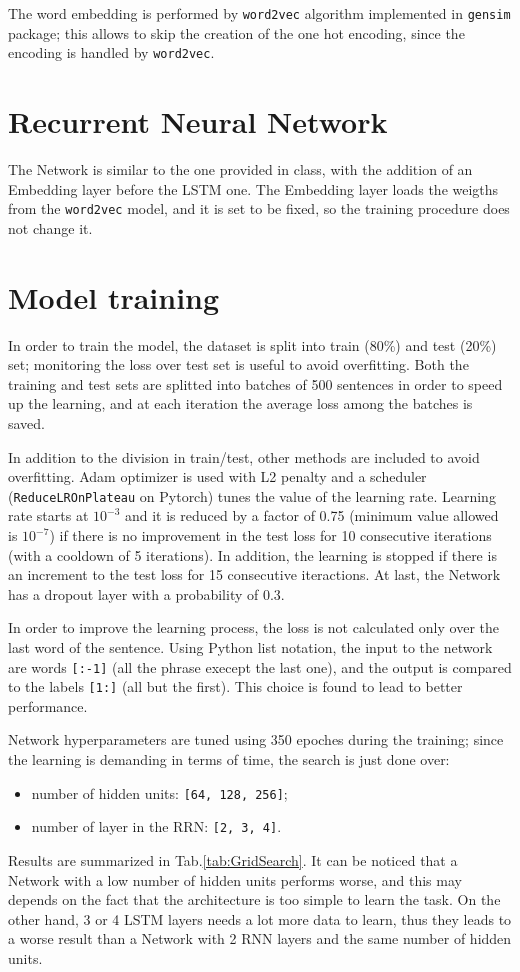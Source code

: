 \documentclass[a4paper,11pt]{article}
\begin{document}
The word embedding is performed by \texttt{word2vec} algorithm implemented in \texttt{gensim} package; this allows to skip the creation of the one hot encoding, since the encoding is handled by \texttt{word2vec}.

\section{Recurrent Neural Network}

The Network is similar to the one provided in class, with the addition of an Embedding layer before the LSTM one. The Embedding layer loads the weigths from the \texttt{word2vec} model, and it is set to be fixed, so the training procedure does not change it.

\section{Model training}
In order to train the model, the dataset is split into train (80\%) and test (20\%) set; monitoring the loss over test set is useful to avoid overfitting. Both the training and test sets are splitted into batches of 500 sentences in order to speed up the learning, and at each iteration the average loss among the batches is saved.

In addition to the division in train/test, other methods are included to avoid overfitting. Adam optimizer is used with L2 penalty and a scheduler (\texttt{ReduceLROnPlateau} on Pytorch) tunes the value of the learning rate. Learning rate starts at $10^{-3}$ and it is reduced by a factor of 0.75 (minimum value allowed is $10^{-7}$) if there is no improvement in the test loss for 10 consecutive iterations (with a cooldown of 5 iterations). In addition, the learning is stopped if there is an increment to the test loss for 15 consecutive iteractions. At last, the Network has a dropout layer with a probability of 0.3.

In order to improve the learning process, the loss is not calculated only over the last word of the sentence. Using Python list notation, the input to the network are words \texttt{[:-1]} (all the phrase execept the last one), and the output is compared to the labels \texttt{[1:]} (all but the first). This choice is found to lead to better performance.

Network hyperparameters are tuned using 350 epoches during the training; since the learning is demanding in terms of time, the search is just done over:
\begin{itemize}
  \item number of hidden units: \texttt{[64, 128, 256]};
  \item number of layer in the RRN: \texttt{[2, 3, 4]}.
\end{itemize}
Results are summarized in Tab.\ref{tab:GridSearch}. It can be noticed that a Network with a low number of hidden units performs worse, and this may depends on the fact that the architecture is too simple to learn the task. On the other hand, 3 or 4 LSTM layers needs a lot more data to learn, thus they leads to a worse result than a Network with 2 RNN layers and the same number of hidden units.
\end{document}
